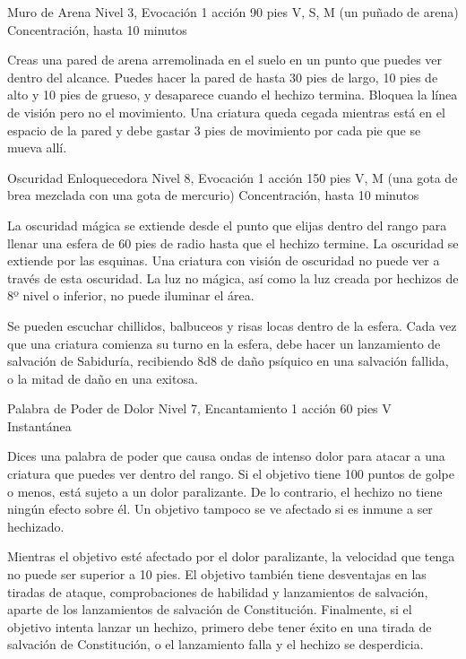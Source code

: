\documentclass[a4paper,twocolumn,openany,10pt]{dndbook}
\begin{document}
\spellheader%
	{Muro de Arena}
	{Nivel 3, Evocación}
	{1 acción}
	{90 pies}
	{V, S, M (un puñado de arena)}
	{Concentración, hasta 10 minutos}
	
	Creas una pared de arena arremolinada en el suelo en un punto que puedes ver dentro del alcance. Puedes hacer la pared de
	hasta 30 pies de largo, 10 pies de alto y 10 pies de grueso, y desaparece cuando el hechizo termina. Bloquea la línea de
	visión pero no el movimiento. Una criatura queda cegada mientras está en el espacio de la pared y debe gastar 3 pies de
	movimiento por cada pie que se mueva allí. 





\spellheader%
	{Oscuridad Enloquecedora}
	{Nivel 8, Evocación}
	{1 acción}
	{150 pies}
	{V, M (una gota de brea mezclada con una gota de mercurio)}
	{Concentración, hasta 10 minutos}
	
	La oscuridad mágica se extiende desde el punto que elijas dentro del rango para llenar una esfera de 60 pies de radio hasta
	que el hechizo termine. La oscuridad se extiende por las esquinas. Una criatura con visión de oscuridad no puede ver a
	través de esta oscuridad. La luz no mágica, así como la luz creada por hechizos de 8º nivel o inferior, no puede iluminar el
	área.
	
	Se pueden escuchar chillidos, balbuceos y risas locas dentro de la esfera. Cada vez que una criatura comienza su turno en la
	esfera, debe hacer un lanzamiento de salvación de Sabiduría, recibiendo 8d8 de daño psíquico en una salvación fallida, o la
	mitad de daño en una exitosa. 

\spellheader%
	{Palabra de Poder de Dolor}
	{Nivel 7, Encantamiento}
	{1 acción}
	{60 pies}
	{V}
	{Instantánea}
	
	Dices una palabra de poder que causa ondas de intenso dolor para atacar a una criatura que puedes ver dentro del rango. Si
	el objetivo tiene 100 puntos de golpe o menos, está sujeto a un dolor paralizante. De lo contrario, el hechizo no tiene
	ningún efecto sobre él. Un objetivo tampoco se ve afectado si es inmune a ser hechizado.
	
	Mientras el objetivo esté afectado por el dolor paralizante, la velocidad que tenga no puede ser superior a 10 pies. El
	objetivo también tiene desventajas en las tiradas de ataque, comprobaciones de habilidad y lanzamientos de salvación, aparte
	de los lanzamientos de salvación de Constitución. Finalmente, si el objetivo intenta lanzar un hechizo, primero debe tener
	éxito en una tirada de salvación de Constitución, o el lanzamiento falla y el hechizo se desperdicia.
	
\end{document}
